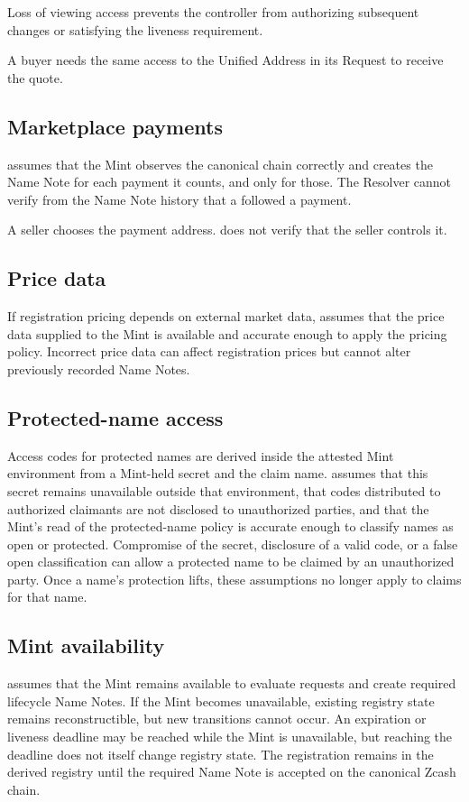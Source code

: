 Loss of viewing access prevents the controller from authorizing subsequent changes or satisfying the liveness requirement.

A buyer needs the same access to the Unified Address in its  Request to receive the quote.

\subsection{Marketplace payments}

\zns{} assumes that the Mint observes the canonical chain correctly and creates the  Name Note for each payment it counts, and only for those. The Resolver cannot verify from the Name Note history that a  followed a payment.

A seller chooses the payment address. \zns{} does not verify that the seller controls it.

\subsection{Price data}

If registration pricing depends on external market data, \zns{} assumes that the price data supplied to the Mint is available and accurate enough to apply the pricing policy. Incorrect price data can affect registration prices but cannot alter previously recorded Name Notes.

\subsection{Protected-name access}

Access codes for protected names are derived inside the attested Mint environment from a Mint-held secret and the claim name. \zns{} assumes that this secret remains unavailable outside that environment, that codes distributed to authorized claimants are not disclosed to unauthorized parties, and that the Mint's read of the protected-name policy is accurate enough to classify names as open or protected. Compromise of the secret, disclosure of a valid code, or a false open classification can allow a protected name to be claimed by an unauthorized party. Once a name's protection lifts, these assumptions no longer apply to claims for that name.

\subsection{Mint availability}

\zns{} assumes that the Mint remains available to evaluate requests and create required lifecycle  Name Notes. If the Mint becomes unavailable, existing registry state remains reconstructible, but new transitions cannot occur. An expiration or liveness deadline may be reached while the Mint is unavailable, but reaching the deadline does not itself change registry state. The registration remains in the derived registry until the required  Name Note is accepted on the canonical Zcash chain.
